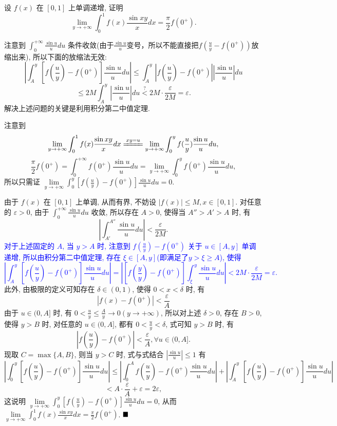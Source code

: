 \documentclass[lang=cn,newtx,10pt,scheme=chinese]{elegantbook}
\begin{document}
\begin{example}
设 $f(x)$ 在 $[0, 1]$ 上单调递增, 证明
$$ \lim\limits_{y \to +\infty} \int_{0}^{1} f(x) \frac{\sin xy}{x} dx = \frac{\pi}{2} f(0^+). $$
\end{example}

\begin{remark}
注意到 $\int_{0}^{+\infty} \frac{\sin u}{u} du$ 条件收敛(由于$\frac{\sin u}{u}$变号，所以不能直接把$f(\frac{u}{y}-f(0^+))$放缩出来), 所以下面的放缩法无效:
$$ |\int_{A}^{y} [f(\frac{u}{y}) - f(0^{+})] \frac{\sin u}{u} du| \le \int_{A}^{y} |f(\frac{u}{y}) - f(0^{+})| |\frac{\sin u}{u}| du $$
$$ \le 2M \int_{A}^{y} |\frac{\sin u}{u}| du \stackrel{?}{<} 2M \cdot \frac{\varepsilon}{2M} = \varepsilon. $$
解决上述问题的关键是利用积分第二中值定理.
\end{remark}

\begin{solution}
注意到
$$ \lim\limits_{y \to +\infty} \int_{0}^{1} f(x) \frac{\sin xy}{x} dx \xlongequal{xy=u} \lim\limits_{y \to +\infty} \int_{0}^{y} f(\frac{u}{y}) \frac{\sin u}{u} du, $$
$$ \frac{\pi}{2}f(0^{+}) = \int_{0}^{+\infty} f(0^{+}) \frac{\sin u}{u} du = \lim\limits_{y \to +\infty} \int_{0}^{y} f(0^{+}) \frac{\sin u}{u} du, $$
所以只需证 $\lim\limits_{y \to +\infty} \int_{0}^{y} [f(\frac{u}{y}) - f(0^{+})] \frac{\sin u}{u} du = 0$.

由于 $f(x)$ 在 $[0,1]$ 上单调, 从而有界, 不妨设 $|f(x)| \le M, x \in [0,1]$. 对任意的 $\varepsilon > 0$, 由于 $\int_{0}^{+\infty} \frac{\sin u}{u} du$ 收敛, 所以存在 $A>0$, 使得当 $A''>A'>A$ 时, 有
$$ |\int_{A'}^{A''} \frac{\sin u}{u} du| < \frac{\varepsilon}{2M}. $$
\textcolor{blue}{对于上述固定的 $A$, 当 $y>A$ 时, 注意到 $f(\frac{u}{y}) - f(0^{+})$ 关于 $u \in [A, y]$ 单调递增, 所以由积分第二中值定理, 存在 $\xi \in [A,y]$(即满足了$y>\xi\ge A$), 使得
$$ |\int_{A}^{y} [f(\frac{u}{y}) - f(0^{+})] \frac{\sin u}{u} du| = |[f(\frac{y}{y}) - f(0^{+})] \int_{\xi}^{y} \frac{\sin u}{u} du| < 2M \cdot \frac{\varepsilon}{2M} = \varepsilon. $$}
此外, 由极限的定义可知存在 $\delta \in (0,1)$, 使得 $0<x<\delta$ 时, 有
$$ |f(x) - f(0^{+})| < \frac{\varepsilon}{A} $$
由于 $u \in (0,A]$ 时, 有 $0 < \frac{u}{y} \le \frac{A}{y} \to 0 (y \to +\infty)$, 所以对上述 $\delta > 0$, 存在 $B>0$, 使得 $y>B$ 时, 对任意的 $u \in (0,A]$, 都有 $0 < \frac{u}{y} < \delta$, 式可知 $y>B$ 时, 有
$$ |f(\frac{u}{y}) - f(0^{+})| < \frac{\varepsilon}{A}, \forall u \in (0,A]. $$
现取 $C = \max\{A,B\}$, 则当 $y>C$ 时, 式与式结合 $|\frac{\sin u}{u}| \le 1$ 有
$$ |\int_{0}^{y} [f(\frac{u}{y}) - f(0^{+})] \frac{\sin u}{u} du| \le |\int_{0}^{A} f(\frac{u}{y}) - f(0^{+}) \frac{\sin u}{u} du| + |\int_{A}^{y} [f(\frac{u}{y}) - f(0^{+})] \frac{\sin u}{u} du| $$
$$ < A \cdot \frac{\varepsilon}{A} + \varepsilon = 2\varepsilon, $$
这说明 $\lim\limits_{y \to +\infty} \int_{0}^{y} [f(\frac{u}{y}) - f(0^{+})] \frac{\sin u}{u} du = 0$, 从而 $\lim\limits_{y \to +\infty} \int_{0}^{1} f(x) \frac{\sin xy}{x} dx = \frac{\pi}{2}f(0^{+})$.
$\hfill \blacksquare$
\end{solution}
\end{document}
